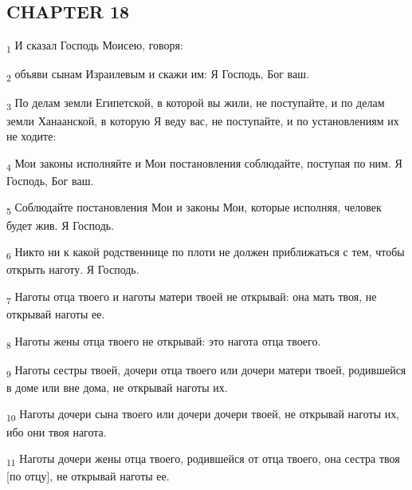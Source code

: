 \subsection{CHAPTER 18}
\begin{tcolorbox}
\textsubscript{1} И сказал Господь Моисею, говоря:
\end{tcolorbox}
\begin{tcolorbox}
\textsubscript{2} объяви сынам Израилевым и скажи им: Я Господь, Бог ваш.
\end{tcolorbox}
\begin{tcolorbox}
\textsubscript{3} По делам земли Египетской, в которой вы жили, не поступайте, и по делам земли Ханаанской, в которую Я веду вас, не поступайте, и по установлениям их не ходите:
\end{tcolorbox}
\begin{tcolorbox}
\textsubscript{4} Мои законы исполняйте и Мои постановления соблюдайте, поступая по ним. Я Господь, Бог ваш.
\end{tcolorbox}
\begin{tcolorbox}
\textsubscript{5} Соблюдайте постановления Мои и законы Мои, которые исполняя, человек будет жив. Я Господь.
\end{tcolorbox}
\begin{tcolorbox}
\textsubscript{6} Никто ни к какой родственнице по плоти не должен приближаться с тем, чтобы открыть наготу. Я Господь.
\end{tcolorbox}
\begin{tcolorbox}
\textsubscript{7} Наготы отца твоего и наготы матери твоей не открывай: она мать твоя, не открывай наготы ее.
\end{tcolorbox}
\begin{tcolorbox}
\textsubscript{8} Наготы жены отца твоего не открывай: это нагота отца твоего.
\end{tcolorbox}
\begin{tcolorbox}
\textsubscript{9} Наготы сестры твоей, дочери отца твоего или дочери матери твоей, родившейся в доме или вне дома, не открывай наготы их.
\end{tcolorbox}
\begin{tcolorbox}
\textsubscript{10} Наготы дочери сына твоего или дочери дочери твоей, не открывай наготы их, ибо они твоя нагота.
\end{tcolorbox}
\begin{tcolorbox}
\textsubscript{11} Наготы дочери жены отца твоего, родившейся от отца твоего, она сестра твоя [по отцу], не открывай наготы ее.
\end{tcolorbox}
